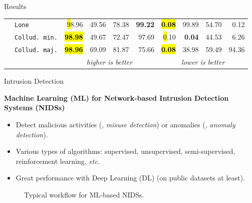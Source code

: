 \begin{frame}{Results}
\begin{table}
\begin{tabularx}{.8\textwidth}{lX|rrrr|rrrr}
      & \texttt{Lone}          & \hl 98.96 & 49.56 & 78.38 & \textbf{99.22} &\hl \textbf{0.08} & 99.89 & 54.70 & 0.12 \\
      & \texttt{Collud. min.}  & \hl \textbf{98.98} & 49.67 & 72.47 & 97.69 & \hl 0.10 & \textbf{0.04} & 44.53 & 6.26 \\
      & \texttt{Collud. maj.}  & \hl \textbf{98.96} & 69.09 & 81.87 & 75.66 & \hl \textbf{0.08} & 38.98 & 59.49 & 94.36 \\          
      \bottomrule %
      \small & \multicolumn{1}{c}{} & \multicolumn{4}{c}{\emph{higher is better}} & \multicolumn{4}{c}{\emph{lower is better}}
    \end{tabularx}
  \end{table}
  
\end{frame}
\begin{frame}{Intrusion Detection}
  
  \textbf{Machine Learning (ML) for Network-based Intrusion Detection Systems (NIDSs)}
  \begin{itemize}
    \item Detect \alert{malicious} activities (\ie, \textit{misuse detection}) or \alert{anomalies} (\ie, \textit{anomaly detection}).
    \item Various types of algorithms: \alert<2>{supervised}, unsupervised, semi-supervised, reinforcement learning, \textit{etc}.
    \item Great performance with Deep Learning (DL) (on public datasets at least).
  \end{itemize}
  \bigskip
    
  \begin{figure}
    \centering
    \caption{Typical workflow for ML-based NIDSs.}
  \end{figure}
\end{frame}





